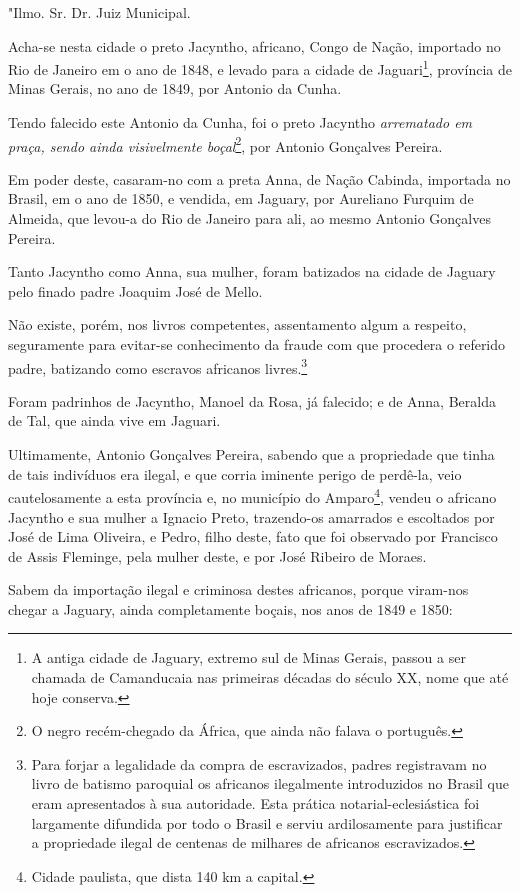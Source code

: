 "Ilmo. Sr. Dr. Juiz Municipal.

Acha-se nesta cidade o preto Jacyntho, africano, Congo de Nação,
importado no Rio de Janeiro em o ano de 1848, e levado para a cidade de
Jaguari\footnote{A antiga cidade de Jaguary, extremo sul de Minas
  Gerais, passou a ser chamada de Camanducaia nas primeiras décadas do
  século XX, nome que até hoje conserva.}, província de Minas Gerais, no
ano de 1849, por Antonio da Cunha.

Tendo falecido este Antonio da Cunha, foi o preto Jacyntho
\emph{arrematado em praça, sendo ainda visivelmente boçal}\footnote{O
  negro recém-chegado da África, que ainda não falava o português.}, por
Antonio Gonçalves Pereira.

Em poder deste, casaram-no com a preta Anna, de Nação Cabinda, importada
no Brasil, em o ano de 1850, e vendida, em Jaguary, por Aureliano
Furquim de Almeida, que levou-a do Rio de Janeiro para ali, ao mesmo
Antonio Gonçalves Pereira.

Tanto Jacyntho como Anna, sua mulher, foram batizados na cidade de
Jaguary pelo finado padre Joaquim José de Mello.

Não existe, porém, nos livros competentes, assentamento algum a
respeito, seguramente para evitar-se conhecimento da fraude com que
procedera o referido padre, batizando como escravos africanos
livres.\footnote{Para forjar a legalidade da compra de escravizados,
  padres registravam no livro de batismo paroquial os africanos
  ilegalmente introduzidos no Brasil que eram apresentados à sua
  autoridade. Esta prática notarial-eclesiástica foi largamente
  difundida por todo o Brasil e serviu ardilosamente para justificar a
  propriedade ilegal de centenas de milhares de africanos escravizados.}

Foram padrinhos de Jacyntho, Manoel da Rosa, já falecido; e de Anna,
Beralda de Tal, que ainda vive em Jaguari.

Ultimamente, Antonio Gonçalves Pereira, sabendo que a propriedade que
tinha de tais indivíduos era ilegal, e que corria iminente perigo de
perdê-la, veio cautelosamente a esta província e, no município do
Amparo\footnote{Cidade paulista, que dista 140 km a capital.}, vendeu
o africano Jacyntho e sua mulher a Ignacio Preto, trazendo-os amarrados
e escoltados por José de Lima Oliveira, e Pedro, filho deste, fato que
foi observado por Francisco de Assis Fleminge, pela mulher deste, e por
José Ribeiro de Moraes.

Sabem da importação ilegal e criminosa destes africanos, porque
viram-nos chegar a Jaguary, ainda completamente boçais, nos anos de 1849
e 1850:

